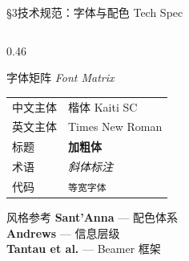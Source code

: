 \documentclass[aspectratio=169,10pt]{beamer}
\newcommand{\EN}[1]{\textit{#1}}
\newcommand{\sectag}[1]{\textmd{\small\normalfont\textcolor{deepblue!60}{#1}}}
\begin{document}
\begin{frame}{\S3\quad 技术规范：字体与配色 \sectag{Tech Spec}}
\begin{columns}[T]
\begin{column}{0.46\textwidth}
\begin{block}{\small 字体矩阵 \EN{Font Matrix}}
\begin{tabular}{ll}
          中文主体 & 楷体 Kaiti SC \\
          英文主体 & Times New Roman \\
          标题 & \textbf{加粗体} \\
          术语 & \textit{斜体标注} \\
          代码 & \texttt{等宽字体} \\
          \bottomrule
        \end{tabular}
      \end{block}
      \vspace{4pt}
      \begin{alertblock}{\small 风格参考}
        \footnotesize
        \textbf{Sant'Anna} — 配色体系\\
        \textbf{Andrews} — 信息层级\\
        \textbf{Tantau et al.} — Beamer 框架
      \end{alertblock}
    \end{column}
  \end{columns}
\end{frame}
\end{document}
